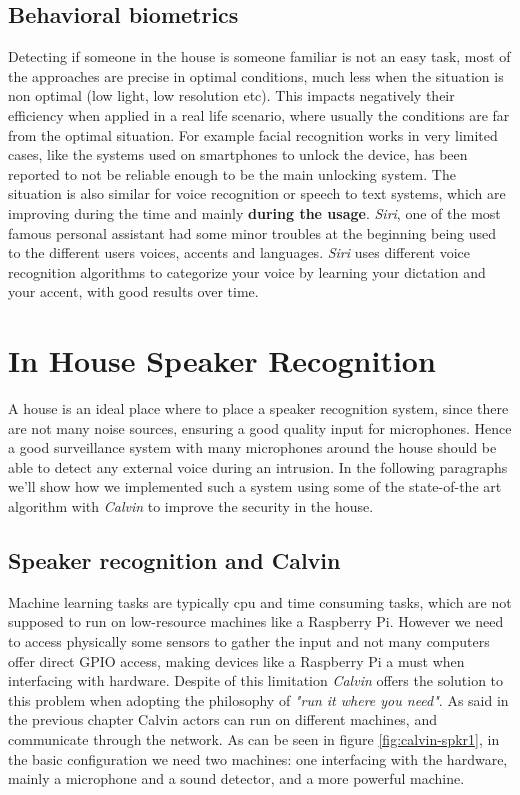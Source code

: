 \subsection{Behavioral biometrics}
Detecting if someone in the house is someone familiar is not an easy task, most
of the approaches are precise in optimal conditions, much less when the situation
is non optimal (low light, low resolution etc). This impacts negatively their efficiency
when applied in a real life scenario, where usually the conditions are far from the optimal
situation. For example facial recognition works in very limited cases, like the systems
used on smartphones to unlock the device, has been reported to not be reliable enough
to be the main unlocking system. The situation is also similar for voice recognition or
speech to text systems, which are improving during the time and mainly \textbf{during the usage}.
\textit{Siri}, one of the most famous personal assistant had some minor troubles at the beginning
being used to the different users voices, accents and languages. \textit{Siri} uses
different voice recognition algorithms to categorize your voice by learning your
dictation and your accent, with good results over time.


\section{In House Speaker Recognition}

A house is an ideal place where to place a speaker recognition system,
since there are not many noise sources, ensuring a good quality input
for microphones. Hence a good surveillance system with many microphones around
the house should be able to detect any external voice during an intrusion. In the following
paragraphs we'll show how we implemented such a system using some of the state-of-the art
algorithm with \textit{Calvin} to improve the security in the house.

\subsection{Speaker recognition and Calvin}

Machine learning tasks are typically cpu and time consuming tasks, which
are not supposed to run on low-resource machines like a Raspberry Pi. However
we need to access physically some sensors to gather the input and not many computers
offer direct GPIO access, making devices like a Raspberry Pi a must when interfacing
with hardware. Despite of this limitation \textit{Calvin} offers the solution to this problem
when adopting the philosophy of \textit{"run it where you need"}. As said in the previous chapter
Calvin actors can run on different machines, and communicate through the network.
As can be seen in figure \ref{fig:calvin-spkr1}, in the basic configuration we need two machines:
one interfacing with the hardware, mainly a microphone and a sound detector, and a more powerful
machine.

